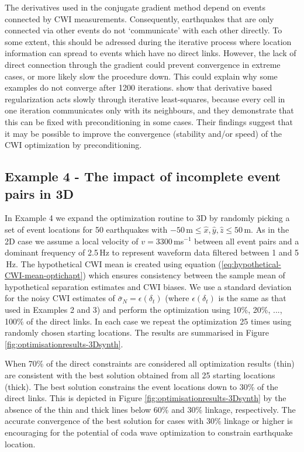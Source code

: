 \documentclass[12pt,double]{article}
\begin{document}
The derivatives used in the conjugate gradient method depend on
events connected by CWI measurements. Consequently, earthquakes that
are only connected via other events do not `communicate' with each
other directly. To some extent, this should be adressed during the
iterative process where location information can spread to events
which have no direct links. However, the lack of direct connection
through the gradient could prevent convergence in extreme cases, or
more likely slow the procedure down. This could explain why some
examples do not converge after 1200 iterations.
\citet{dr_VanDecar94a} show that derivative based regularization acts slowly
through iterative least-squares, because
 every cell in one iteration communicates only with its neighbours, and they demonstrate that this can be
fixed with preconditioning in some cases. Their findings suggest
that it may be possible to improve the convergence (stability and/or
speed) of the CWI optimization by preconditioning.

\subsection*{Example 4 - The impact of incomplete event pairs in 3D}

In Example 4 we expand the optimization routine to 3D by randomly
picking a set of event locations for 50 earthquakes with
$-50$\,m$\leq \hat{x},\hat{y},\hat{z} \leq 50$\,m. As in the 2D case
we assume a local velocity of $v=3300\,$ms$^{-1}$ between all event
pairs and a dominant frequency of 2.5$\,$Hz to represent
 waveform data filtered between 1 and 5$\,$Hz.
The hypothetical CWI mean is created using equation
(\ref{eq:hypothetical-CWI-mean-optichapt}) which ensures consistency
between the sample mean of hypothetical separation estimates and CWI
biases. We use a standard deviation for the noisy CWI estimates of
$\bar{\sigma}_N = \epsilon(\delta_t)$ (where $\epsilon(\delta_t)$ is the same 
as that used in Examples 2 and 3) and perform the optimization
using 10\%, 20\%, ..., 100\% of the direct links. In each case we
repeat the optimization 25 times using randomly chosen starting
locations. The results are summarised in Figure
\ref{fig:optimisationresults-3Dsynth}.


When 70\% of the direct constraints are considered all optimization
results (thin) are consistent with the best solution obtained from
all 25 starting locations (thick). The
best solution constrains the event locations down to 30\% of the
direct links. This is depicted in Figure
\ref{fig:optimisationresults-3Dsynth} by the absence of the thin and
thick lines below 60\% and 30\% linkage, respectively.
The accurate convergence of the best
solution for cases with 30\% linkage or higher is encouraging for
the potential of coda wave optimization to constrain earthquake
location.
\end{document}
